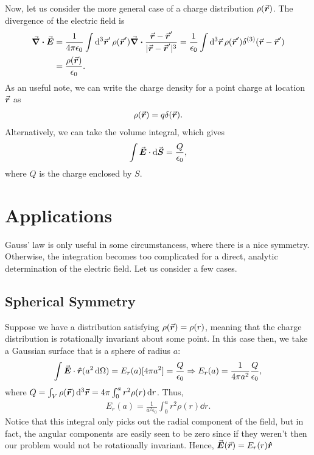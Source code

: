Now, let us consider the more general case of a charge distribution $\rho(\va*{r})$.
The divergence of the electric field is
\begin{align}
    \div{\va*{E}} &= \frac{1}{4 \pi \epsilon_0} \int \dd[3]{\va*{r}'} \rho(\va*{r}') \div{ \frac{\va*{r} - \va*{r}'}{| \va*{r} - \va*{r}' |^3} } = \frac{1}{\epsilon_0} \int \dd[3]{\va*{r}} \rho(\va*{r}') \delta^{(3)}(\va*{r} - \va*{r}') \nonumber \\
                  &= \frac{\rho(\va*{r})}{\epsilon_0}
.\end{align}
As an useful note, we can write the charge density for a point charge at location $\va*{r}$ as
\begin{eqnarray}
    \rho(\va*{r}) = q \delta(\va*{r})
.\end{eqnarray}
Alternatively, we can take the volume integral, which gives
\begin{eqnarray}
    \int \va*{E} \cdot \dd{\va*{S}} = \frac{Q}{\epsilon_0}
,\end{eqnarray}
where $Q$ is the charge enclosed by $S$.


\section{Applications}

Gauss' law is only useful in some circumstancess, where there is a nice symmetry.
Otherwise, the integration becomes too complicated for a direct, analytic determination of the electric field.
Let us consider a few cases.

\subsection{Spherical Symmetry}

Suppose we have a distribution satisfying $\rho(\va*{r}) = \rho(r)$, meaning that the charge distribution is rotationally invariant about some point.
In this case then, we take a Gaussian surface that is a sphere of radius $a$:
\begin{eqnarray}
    \int \va*{E} \cdot \vu*{r} (a^2 \dd{\Omega}) = E_{r}(a) [4 \pi a^2] = \frac{Q}{\epsilon_0} \Rightarrow E_{r}(a) = \frac{1}{4 \pi a^2} \frac{Q}{\epsilon_0}
,\end{eqnarray}
where $Q = \int_{V} \rho(\va*{r}) \dd[3]{\va*{r}} = 4 \pi \int_{0}^{a} r^2 \rho(r) \dd{r}$.
Thus,
\begin{eqnarray}
    E_{r}(a) = \frac{1}{a^2 \epsilon_0} \int_{0}^{a} r^2 \rho(r) \dd{r}
.\end{eqnarray}
Notice that this integral only picks out the radial component of the field, but in fact, the angular components are easily seen to be zero since if they weren't then our problem would not be rotationally invariant.
Hence, $\va*{E}(\va*{r}) = E_{r}(r) \vu*{r}$

